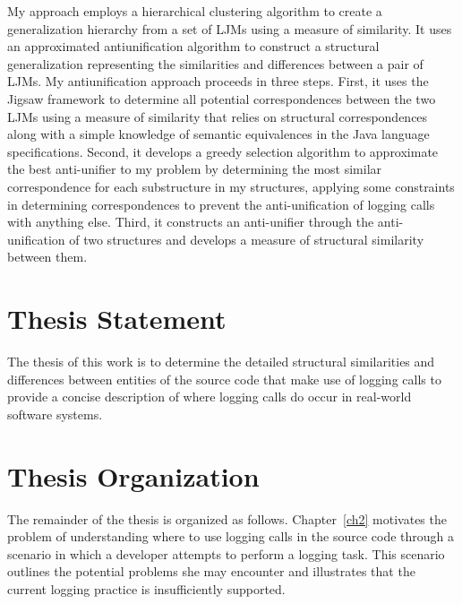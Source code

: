 
My approach employs a hierarchical clustering algorithm to create a generalization hierarchy from a set of LJMs using a measure of similarity. It uses an approximated antiunification algorithm to construct a structural generalization representing the similarities and differences between a pair of LJMs. My antiunification approach proceeds in three steps. First, it uses the Jigsaw framework \cite{cottrell2008semi} to determine all potential correspondences between the two LJMs using a measure of similarity that relies on structural correspondences along with a simple knowledge of semantic equivalences in the Java language specifications. Second, it develops a greedy selection algorithm to approximate the best anti-unifier to my problem by determining the most similar correspondence for each substructure in my structures, applying some constraints in determining correspondences to prevent the anti-unification of logging calls with anything else. Third, it constructs an anti-unifier through the anti-unification of two structures and develops a measure of structural similarity between them.


\section{Thesis Statement} \label{intro-stmt}
The thesis of this work is to determine the detailed structural similarities and differences between entities of the source code that make use of logging calls to provide a concise description of where logging calls do occur in real-world software systems.

\section{Thesis Organization} \label{intro-org}
The remainder of the thesis is organized as follows. Chapter~\ref{ch2} motivates the problem of understanding where to use logging calls in the source code through a scenario in which a developer attempts to perform a logging task. This scenario outlines the potential problems she may encounter and illustrates that the current logging practice is insufficiently supported.

